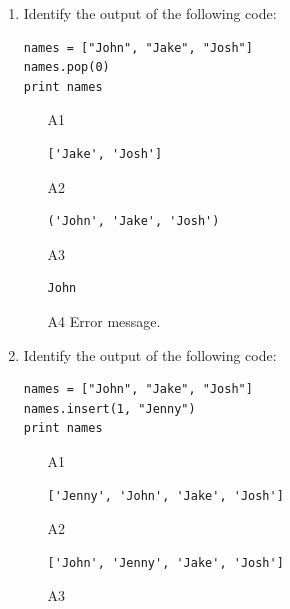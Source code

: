 \begin{enumerate}
\begin{verbatim}
names.append("Jerry")
print names
\end{verbatim}
\begin{enumerate}
\item[A1] 
\begin{verbatim}
['John', 'Jake', 'Josh', 'Jerry']
\end{verbatim}
\item[A2] 
\begin{verbatim}
('John', 'Jake', 'Josh', 'Jerry')
\end{verbatim}
\item[A3] 
\begin{verbatim}
['Jerry', 'John', 'Jake', 'Josh']
\end{verbatim}
\item[A4] Error message.
\end{enumerate}
\item Identify the output of the following code:
\begin{verbatim}
names = ["John", "Jake", "Josh"]
names.pop(0)
print names
\end{verbatim}
\begin{enumerate}
\item[A1] 
\begin{verbatim}
['Jake', 'Josh']
\end{verbatim}
\item[A2] 
\begin{verbatim}
('John', 'Jake', 'Josh')
\end{verbatim}
\item[A3] 
\begin{verbatim}
John
\end{verbatim}
\item[A4] Error message.
\end{enumerate}
\item Identify the output of the following code:
\begin{verbatim}
names = ["John", "Jake", "Josh"]
names.insert(1, "Jenny")
print names
\end{verbatim}
\begin{enumerate}
\item[A1] 
\begin{verbatim}
['Jenny', 'John', 'Jake', 'Josh']
\end{verbatim}
\item[A2] 
\begin{verbatim}
['John', 'Jenny', 'Jake', 'Josh']
\end{verbatim}
\item[A3] 

\end{enumerate}
\end{enumerate}
